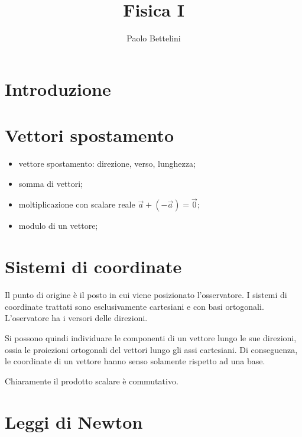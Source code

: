 \documentclass[a4paper]{article}
\title{Fisica I}
\author{Paolo Bettelini}
\date{}
\begin{document}
\maketitle
\tableofcontents

\section{Introduzione}

\section{Vettori spostamento}

\begin{itemize}
    \item vettore spostamento: direzione, verso, lunghezza;
    \item somma di vettori;
    \item moltiplicazione con scalare reale \(\vec{a} + (-\vec{a}) = \vec{0}\);
    \item modulo di un vettore;
\end{itemize}


\section{Sistemi di coordinate}

Il punto di origine è il posto in cui viene posizionato l'osservatore.
I sistemi di coordinate trattati sono esclusivamente cartesiani e con basi ortogonali.
L'oservatore ha i versori delle direzioni.

Si possono quindi individuare le componenti di un vettore lungo le sue direzioni, ossia
le proiezioni ortogonali del vettori lungo gli assi cartesiani.
Di conseguenza, le coordinate di un vettore hanno senso solamente rispetto ad una base.


Chiaramente il prodotto scalare è commutativo.



\section{Leggi di Newton}
\end{document}
